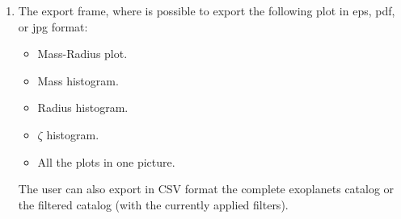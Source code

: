 \documentclass[fleqn,10pt]{SelfArx} %
\begin{document}
\begin{enumerate}
                \item The export frame, where is possible to export the following plot in eps, pdf, or jpg format:
                \begin{itemize}
                    \item Mass-Radius plot.
                    \item Mass histogram.
                    \item Radius histogram.
                    \item $\zeta$ histogram.
                    \item All the plots in one picture.
                \end{itemize}

               The user can also export in CSV format the complete exoplanets catalog or the filtered catalog (with the currently applied filters).
            \end{enumerate}

    \onecolumn
\end{document}
